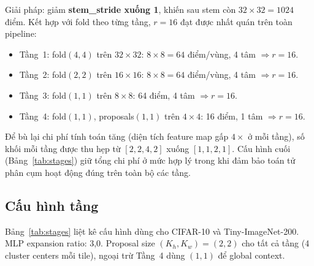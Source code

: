 \documentclass[conference]{IEEEtran}
\begin{document}
Giải pháp: giảm \textbf{stem\_stride xuống 1}, khiến sau stem còn
$32\!\times\!32=1024$ điểm. Kết hợp với fold theo từng tầng, $r=16$
đạt được nhất quán trên toàn pipeline:
\begin{itemize}
  \item Tầng~1: fold$(4,4)$ trên $32\!\times\!32$:
        $8\!\times\!8=64$ điểm/vùng, 4 tâm $\Rightarrow r=16$. 
  \item Tầng~2: fold$(2,2)$ trên $16\!\times\!16$:
        $8\!\times\!8=64$ điểm/vùng, 4 tâm $\Rightarrow r=16$. 
  \item Tầng~3: fold$(1,1)$ trên $8\!\times\!8$:
        64 điểm, 4 tâm $\Rightarrow r=16$. 
  \item Tầng~4: fold$(1,1)$, proposals$(1,1)$ trên $4\!\times\!4$:
        16 điểm, 1 tâm $\Rightarrow r=16$. 
\end{itemize}

Để bù lại chi phí tính toán tăng (diện tích feature map gấp $4\times$
ở mỗi tầng), số khối mỗi tầng được thu hẹp từ $[2,2,4,2]$ xuống
$[1,1,2,1]$. Cấu hình cuối (Bảng~\ref{tab:stages}) giữ tổng chi phí
ở mức hợp lý trong khi đảm bảo toán tử phân cụm hoạt động đúng trên
toàn bộ các tầng.

\subsection{Cấu hình tầng}

Bảng~\ref{tab:stages} liệt kê cấu hình dùng cho CIFAR-10 và
Tiny-ImageNet-200. MLP expansion ratio:
3,0. Proposal size $(K_h,K_w){=}(2,2)$ cho tất cả tầng (4 cluster
centers mỗi tile), ngoại trừ Tầng~4 dùng $(1,1)$ để global context.

\begin{table}[h]
  \caption{Cấu hình tầng của HBCC-Small (S) và HBCC-Medium (M) cho
           đầu vào $32\!\times\!32$.
           $d$: số block; $C$: embed dim; $\rho$: local ratio.}
  \label{tab:stages}
  \centering
  \renewcommand{\arraystretch}{1.15}
\end{table}
\end{document}
